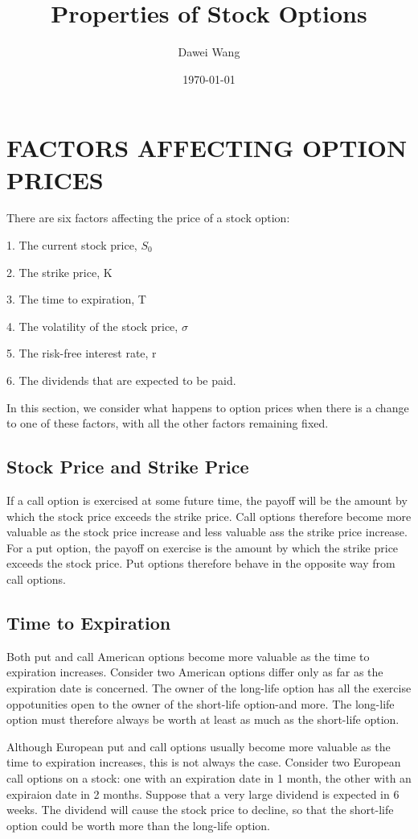 \documentclass{article}
\title{Properties of Stock Options}
\author{Dawei Wang}
\date{\today}
\begin{document}
	\maketitle
\section{FACTORS AFFECTING OPTION PRICES}
There are six factors affecting the price of a stock option:

1. The current stock price, $ S_0 $

2. The strike price, K

3. The time to expiration, T

4. The volatility of the stock price, $ \sigma $

5. The risk-free interest rate, r

6. The dividends that are expected to be paid.

\hspace*{\fill}

In this section, we consider what happens to option prices when there is a change to one of these factors, with all the other factors remaining fixed.

\subsection{Stock Price and Strike Price}
If a call option is exercised at some future time, the payoff will be the amount by which the stock price exceeds the strike price. Call options therefore become more valuable as the  stock price increase and less valuable ass the strike price increase. For a put option, the payoff on exercise is the amount by which the strike price exceeds the stock price. Put options therefore behave in the opposite way from call options.

\subsection{Time to Expiration}
Both put and call American options become more valuable as the time to expiration increases. Consider two American options differ only as far as the expiration date is concerned. The owner of the long-life option has all the exercise oppotunities open to the owner of the short-life option-and more. The long-life option must therefore always be worth at least as much as the short-life option.

Although European put and call options usually become more valuable as the time to expiration increases, this is not always the case. Consider two European call options on a stock: one with an expiration date in 1 month, the other with an expiraion date in 2 months. Suppose that a very large dividend is expected in 6 weeks. The dividend will cause the stock price to decline, so that the short-life option could be worth more than the long-life option.
\end{document}
